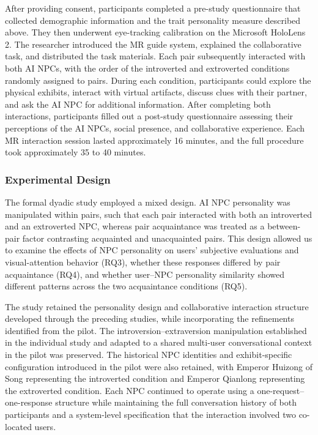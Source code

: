 \documentclass[a4paper,fleqn]{cas-sc}
\begin{document}
After providing consent, participants completed a pre-study questionnaire that collected demographic information and the trait personality measure described above. They then underwent eye-tracking calibration on the Microsoft HoloLens 2. The researcher introduced the MR guide system, explained the collaborative task, and distributed the task materials. Each pair subsequently interacted with both AI NPCs, with the order of the introverted and extroverted conditions randomly assigned to pairs. During each condition, participants could explore the physical exhibits, interact with virtual artifacts, discuss clues with their partner, and ask the AI NPC for additional information. After completing both interactions, participants filled out a post-study questionnaire assessing their perceptions of the AI NPCs, social presence, and collaborative experience. Each MR interaction session lasted approximately 16 minutes, and the full procedure took approximately 35 to 40 minutes.

\subsubsection{Experimental Design}

The formal dyadic study employed a mixed design. AI NPC personality was manipulated within pairs, such that each pair interacted with both an introverted and an extroverted NPC, whereas pair acquaintance was treated as a between-pair factor contrasting acquainted and unacquainted pairs. This design allowed us to examine the effects of NPC personality on users' subjective evaluations and visual-attention behavior (RQ3), whether these responses differed by pair acquaintance (RQ4), and whether user--NPC personality similarity showed different patterns across the two acquaintance conditions (RQ5).

The study retained the personality design and collaborative interaction structure developed through the preceding studies, while incorporating the refinements identified from the pilot. The introversion--extraversion manipulation established in the individual study and adapted to a shared multi-user conversational context in the pilot was preserved. The historical NPC identities and exhibit-specific configuration introduced in the pilot were also retained, with Emperor Huizong of Song representing the introverted condition and Emperor Qianlong representing the extroverted condition. Each NPC continued to operate using a one-request--one-response structure while maintaining the full conversation history of both participants and a system-level specification that the interaction involved two co-located users.
\end{document}
